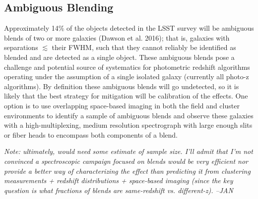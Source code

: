 
%
%


\subsection{Ambiguous Blending}
Approximately 14\% of the objects detected in the LSST survey will be ambiguous
blends of two or more galaxies (Dawson et al. 2016); that is, galaxies with
separations $\lesssim$ their FWHM, such that they cannot reliably be identified as blended and are detected as a single object. These ambiguous blends pose a challenge and
potential source of systematics for photometric redshift algorithms operating
under the assumption of a single isolated galaxy (currently all photo-z
algorithms). By definition these ambiguous blends will go undetected, so it is likely that the best strategy for mitigation will be calibration of the effects.  One option  is to use overlapping space-based imaging in both the field and cluster
environments to identify a sample of ambiguous blends and observe these galaxies
with a high-multiplexing, medium resolution spectrograph with large enough slits or fiber heads to encompass both components of a blend.

{\em Note: ultimately, would need some estimate of sample size.  I'll admit that I'm not convinced a spectroscopic campaign focused on blends would be very efficient nor provide a better way of characterizing the effect than predicting it from clustering measurements + redshift distributions + space-based imaging (since the key question is what fractions of blends are same-redshift vs. different-z). --JAN}
